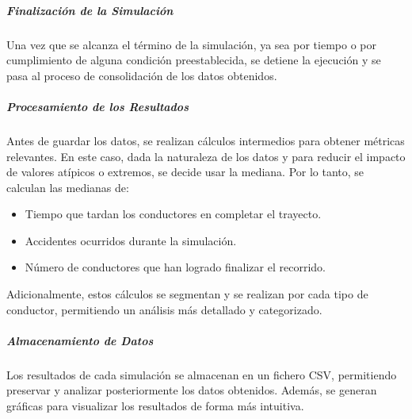 \subparagraph{Finalización de la Simulación} 

Una vez que se alcanza el término de la simulación, ya sea por tiempo o por cumplimiento de alguna condición preestablecida, se detiene la ejecución y se pasa al proceso de consolidación de los datos obtenidos.

\subparagraph{Procesamiento de los Resultados}

Antes de guardar los datos, se realizan cálculos intermedios para obtener métricas relevantes. En este caso, dada la naturaleza de los datos y para reducir el impacto de valores atípicos o extremos, se decide usar la mediana. Por lo tanto, se calculan las medianas de:

\begin{itemize}
    \item Tiempo que tardan los conductores en completar el trayecto.
    \item Accidentes ocurridos durante la simulación.
    \item Número de conductores que han logrado finalizar el recorrido.
\end{itemize}

Adicionalmente, estos cálculos se segmentan y se realizan por cada tipo de conductor, permitiendo un análisis más detallado y categorizado.

\subparagraph{Almacenamiento de Datos}

Los resultados de cada simulación se almacenan en un fichero CSV, permitiendo preservar y analizar posteriormente los datos obtenidos. Además, se generan gráficas para visualizar los resultados de forma más intuitiva.
